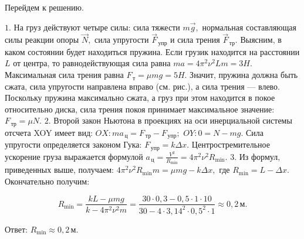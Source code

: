 \documentclass[12pt,a4paper]{article}
\begin{document}
{Перейдем к решению. \begin{center}\end{center} 
$1$.  На груз действуют четыре силы: сила тяжести $m\vec g,$ нормальная составляющая силы реакции опоры $\overrightarrow{N},$ сила упругости $\overrightarrow{F}_{\,\text{упр}}$ и сила трения $\overrightarrow{F}_{\,\text{тр}}.$
Выясним, в каком состоянии будет находиться пружина. Если грузик находится на расстоянии $L$ от центра, то равнодействующая сила равна $ma=4 \pi ^2 \nu ^2 Lm=3$$H$. Максимальная сила трения равна $F_{\,\text{т}} =\mu mg =5$$H$. Значит, пружина должна быть сжата, сила упругости направлена вправо (см. рис.), а сила трения  — влево. Поскольку пружина максимально сжата, а груз при этом находится в покое относительно диска, сила трения покоя принимает максимальное значение: $F_{\,\text{тр}}=\mu N.$
$2$.  Второй закон Ньютона в проекциях на оси инерциальной системы отсчета XOY имеет вид: $OX: ma_{\,\text{ц}}=F_{\,\text{тр}} - F_{\,\text{упр}};$ $OY: 0=N - mg.$ Сила упругости определяется законом Гука: $F_{\,\text{упр}}=k\Delta x.$ Центростремительное ускорение груза выражается формулой $a_{\,\text{ц}}= \frac{V ^2}{R_{\min}} =4 \pi ^2 \nu ^2 R_{\min}.$
$3$.  Из формул, приведенных выше, получаем: $4 \pi ^2 \nu ^2 R_{\min}m=\mu mg - k\Delta x,$ где $R_{\min}=L - \Delta x.$ Окончательно получим:

\[R_{\min}= \frac{kL - \mu mg}{k - 4 \pi ^2 \nu ^2 m} = \frac{30 \cdot 0{,}3 - 0{,}5 \cdot 1 \cdot 10}{30 - 4 \cdot 3{,}14 ^2 \cdot 0{,}5 ^2 \cdot 1} \approx 0{,}2 \,\text{м}.\]

Ответ: $R_{\min}\approx 0{,}2 \,\text{м}.$
}
\end{document}

